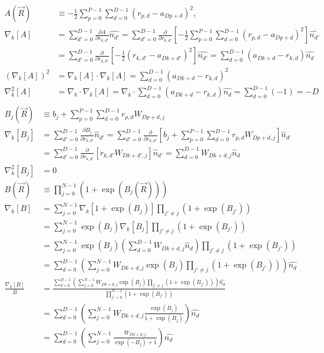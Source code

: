 \documentclass[12pt]{article}
\begin{document}
\begin{align*}
A(\vec{R}) &\equiv -\frac{1}{2} \sum_{p=0}^{P-1}\sum_{d=0}^{D-1} (r_{p,d} - a_{Dp+d})^2,\\
\nabla_k[A]
&= \sum_{d'=0}^{D-1} \frac{\partial A}{\partial r_{k,d'}} \hat{n_{d'}} = \sum_{d'=0}^{D-1} \frac{\partial}{\partial r_{k,d'}} \left[ -\frac{1}{2} \sum_{p=0}^{P-1}\sum_{d=0}^{D-1} (r_{p,d} - a_{Dp+d})^2 \right] \hat{n_{d'}} \\
&= \sum_{d'=0}^{D-1} \frac{\partial}{\partial r_{k,d'}} \left[ -\frac{1}{2}  (r_{k,d'} - a_{Dk+d'})^2 \right] \hat{n_{d'}} = \sum_{d=0}^{D-1} (a_{Dk+d} -r_{k,d} ) \hat{n_{d}}  \\
( \nabla_k[A] )^2 &= \nabla_k[A]  \cdot \nabla_k[A] = \sum_{d=0}^{D-1} (a_{Dk+d} -r_{k,d} )^2\\
\nabla_k^2 [A] &= \nabla_k \cdot \nabla_k[A] = \nabla_k \cdot \sum_{d=0}^{D-1} (a_{Dk+d} -r_{k,d} ) \hat{n_{d}} = \sum_{d=0}^{D-1} (-1) = -D\\ 
\end{align*}
\begin{align*}
B_j(\vec{R}) &\equiv b_j + \sum_{p=0}^{P-1}\sum_{d=0}^{D-1} r_{p,d} W_{Dp+d,j}\\
\nabla_k [B_j]  &= \sum_{d'=0}^{D-1} \frac{\partial B_j}{\partial r_{k,d'}} \hat{n}_{d'} = \sum_{d'=0}^{D-1} \frac{\partial}{\partial r_{k,d'}} \left[ b_j + \sum_{p=0}^{P-1}\sum_{d=0}^{D-1} r_{p,d} W_{Dp+d,j} \right] \hat{n}_{d'}\\
&= \sum_{d'=0}^{D-1} \frac{\partial}{\partial r_{k,d'}} \left[ r_{k,d'} W_{Dk+d',j} \right] \hat{n}_{d'} = \sum_{d=0}^{D-1} W_{Dk+d,j} \hat{n}_d \\
\nabla_k^2 [B_j] &= 0\\
B(\vec{R}) &\equiv \prod_{j=0}^{N-1} \left( 1 + \exp \left( B_j(\vec{R}) \right) \right)\\
\nabla_k [B] &= \sum_{j=0}^{N-1} \nabla_k [1+\exp(B_j)] \prod_{j'\neq j} (1+\exp(B_{j'}))\\
&= \sum_{j=0}^{N-1} \exp (B_j) \nabla_k [B_j] \prod_{j'\neq j} (1+\exp(B_{j'}))\\
&= \sum_{j=0}^{N-1} \exp (B_j) \left( \sum_{d=0}^{D-1} W_{Dk+d,j} \hat{n}_d \right) \prod_{j'\neq j} (1+\exp(B_{j'}))\\
&= \sum_{d=0}^{D-1} \left( \sum_{j=0}^{N-1} W_{Dk+d,j} \exp(B_j)  \prod_{j'\neq j} (1+\exp(B_{j'})) \right) \hat{n_d} \\
\frac{\nabla_k[B]}{B} &= \frac{\sum_{d=0}^{D-1} \left( \sum_{j=0}^{N-1} W_{Dk+d,j} \exp(B_j)  \prod_{j'\neq j} (1+\exp(B_{j'})) \right) \hat{n_d}}{\prod_{j'=0}^{N-1}(1+\exp(B_{j'}))}\\
&= \sum_{d=0}^{D-1} \left( \sum_{j=0}^{N-1} W_{Dk+d,j} \frac{\exp(B_j)}{1+\exp(B_j)} \right) \hat{n_d}\\
&= \sum_{d=0}^{D-1} \left( \sum_{j=0}^{N-1} \frac{W_{Dk+d,j}}{\exp(-B_j)+1} \right) \hat{n_d}\\
\end{align*}
\end{document}
